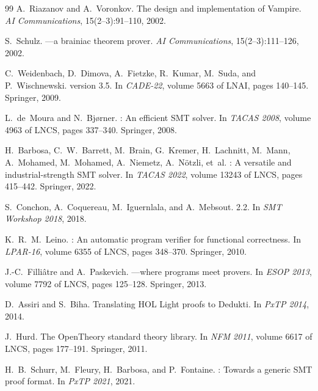 \documentclass[11pt,a4paper]{article}
\begin{document}
\begin{thebibliography}{99}
A.~Riazanov and A.~Voronkov.
\newblock The design and implementation of {Vampire}.
\newblock \emph{AI Communications}, 15(2--3):91--110, 2002.

S.~Schulz.
---a brainiac theorem prover.
\newblock \emph{AI Communications}, 15(2--3):111--126, 2002.

C.~Weidenbach, D.~Dimova, A.~Fietzke, R.~Kumar, M.~Suda, and P.~Wischnewski.
 version 3.5.
\newblock In \emph{CADE-22}, volume 5663 of LNAI, pages 140--145. Springer, 2009.

L.~de~Moura and N.~Bj{\o}rner.
: An efficient {SMT} solver.
\newblock In \emph{TACAS 2008}, volume 4963 of LNCS, pages 337--340. Springer, 2008.

H.~Barbosa, C.~W.~Barrett, M.~Brain, G.~Kremer, H.~Lachnitt, M.~Mann,
A.~Mohamed, M.~Mohamed, A.~Niemetz, A.~N{\"o}tzli, et~al.
: A versatile and industrial-strength {SMT} solver.
\newblock In \emph{TACAS 2022}, volume 13243 of LNCS, pages 415--442. Springer, 2022.

S.~Conchon, A.~Coquereau, M.~Iguernlala, and A.~Mebsout.
 2.2.
\newblock In \emph{SMT Workshop 2018}, 2018.

K.~R.~M.~Leino.
: An automatic program verifier for functional correctness.
\newblock In \emph{LPAR-16}, volume 6355 of LNCS, pages 348--370. Springer, 2010.

J.-C.~Filli{\^a}tre and A.~Paskevich.
---where programs meet provers.
\newblock In \emph{ESOP 2013}, volume 7792 of LNCS, pages 125--128. Springer, 2013.

D.~Assiri and S.~Biha.
\newblock Translating {HOL Light} proofs to {Dedukti}.
\newblock In \emph{PxTP 2014}, 2014.

J.~Hurd.
\newblock The {OpenTheory} standard theory library.
\newblock In \emph{NFM 2011}, volume 6617 of LNCS, pages 177--191. Springer, 2011.

H.~B.~Schurr, M.~Fleury, H.~Barbosa, and P.~Fontaine.
: Towards a generic {SMT} proof format.
\newblock In \emph{PxTP 2021}, 2021.


\end{thebibliography}
\end{document}
